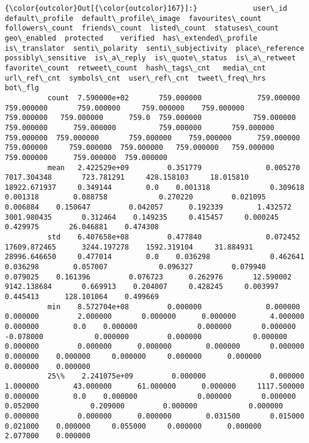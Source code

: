 \documentclass[11pt]{article}
\begin{document}
\begin{Verbatim}[commandchars=\\\{\}]
{\color{outcolor}Out[{\color{outcolor}167}]:}             user\_id  default\_profile  default\_profile\_image  favourites\_count  followers\_count  friends\_count  listed\_count  statuses\_count  geo\_enabled  protected    verified  has\_extended\_profile  is\_translator  senti\_polarity  senti\_subjectivity  place\_reference  possibly\_sensitive  is\_a\_reply  is\_quote\_status  is\_a\_retweet  favorite\_count  retweet\_count  hash\_tags\_cnt   media\_cnt  url\_ref\_cnt  symbols\_cnt  user\_ref\_cnt  tweet\_freq\_hrs     bot\_flg
          count  7.590000e+02       759.000000             759.000000        759.000000       759.000000     759.000000    759.000000      759.000000   759.000000      759.0  759.000000            759.000000     759.000000      759.000000          759.000000       759.000000          759.000000  759.000000       759.000000    759.000000      759.000000     759.000000     759.000000  759.000000   759.000000   759.000000    759.000000      759.000000  759.000000
          mean   2.422529e+09         0.351779               0.005270       7017.304348       723.781291     428.158103     18.015810    18922.671937     0.349144        0.0    0.001318              0.309618       0.001318        0.088758            0.270220         0.021095            0.006884    0.150647         0.042057      0.192339        1.432572    3001.980435       0.312464    0.149235     0.415457     0.000245      0.429975       26.046881    0.474308
          std    6.407658e+08         0.477840               0.072452      17609.872465      3244.197278    1592.319104     31.884931    28996.646650     0.477014        0.0    0.036298              0.462641       0.036298        0.057007            0.096327         0.079940            0.079025    0.161396         0.076723      0.262976       12.590002    9142.138684       0.669913    0.204007     0.428245     0.003997      0.445413      128.101064    0.499669
          min    8.572704e+08         0.000000               0.000000          0.000000         2.000000       0.000000      0.000000        4.000000     0.000000        0.0    0.000000              0.000000       0.000000       -0.078000            0.000000         0.000000            0.000000    0.000000         0.000000      0.000000        0.000000       0.000000       0.000000    0.000000     0.000000     0.000000      0.000000        0.000000    0.000000
          25\%    2.241075e+09         0.000000               0.000000          1.000000        43.000000      61.000000      0.000000     1117.500000     0.000000        0.0    0.000000              0.000000       0.000000        0.052000            0.209000         0.000000            0.000000    0.000000         0.000000      0.000000        0.031500       0.015000       0.021000    0.000000     0.055000     0.000000      0.000000        2.077000    0.000000

\end{Verbatim}
\end{document}
